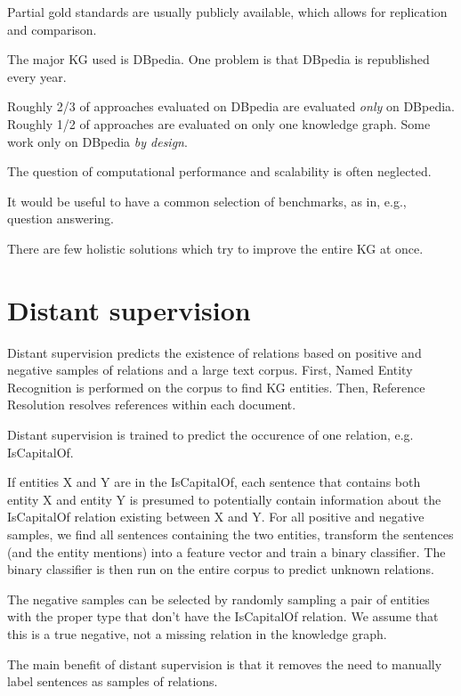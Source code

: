 Partial gold standards are usually publicly available, which allows for
replication and comparison.

The major KG used is DBpedia. One problem is that DBpedia is republished every
year.

Roughly 2/3 of approaches evaluated on DBpedia are evaluated \textit{only} on
DBpedia. Roughly 1/2 of approaches are evaluated on only one knowledge graph.
Some work only on DBpedia \textit{by design}.

The question of computational performance and scalability is often neglected.

It would be useful to have a common selection of benchmarks, as in, e.g.,
question answering.

There are few holistic solutions which try to improve the entire KG at once.

\section{Distant supervision}
\label{distant-supervision}
Distant supervision\cite{distant-supervision} predicts the existence of
relations based on positive and negative samples of relations and a large text
corpus. First, Named Entity Recognition is performed on the corpus to find KG
entities.
Then, Reference Resolution resolves references within each document.

Distant supervision is trained to predict the occurence of one relation,
e.g. IsCapitalOf.

If entities X and Y are in the IsCapitalOf, each sentence that contains both
entity X and entity Y is presumed to potentially contain information about
the IsCapitalOf relation existing between X and Y.
For all positive and negative samples, we find all sentences containing the two
entities, transform the sentences (and the entity mentions) into a feature
vector and train a binary classifier.
The binary classifier is then run on the entire corpus to predict unknown
relations.

The negative samples can be selected
by randomly sampling a pair of entities with the proper type that don't have the
IsCapitalOf relation. We assume that this is a true negative, not a missing
relation in the knowledge graph.

The main benefit of distant supervision is that it removes the need to manually
label sentences as samples of relations.

